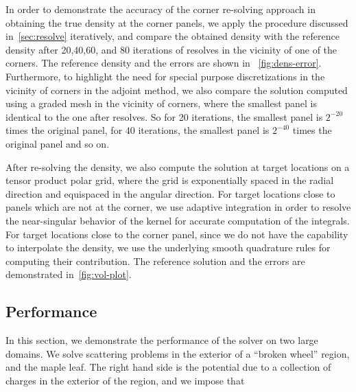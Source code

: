 In order to demonstrate the accuracy of the corner re-solving approach in obtaining the true density at the corner panels, we  apply the procedure
discussed in~\cref{sec:resolve} iteratively, and compare the obtained density with the reference density after 20,40,60, and
80 iterations of resolves in the vicinity of one of the corners. The reference density and the errors are shown in ~\cref{fig:dens-error}. Furthermore, to highlight the need for special purpose discretizations in the vicinity of corners in the adjoint method, we also compare the solution computed using a graded mesh in the vicinity of corners, where the smallest panel is identical
to the one after resolves. So for 20 iterations, the smallest panel is $2^{-20}$ times the original panel, for $40$ iterations,
the smallest panel is $2^{-40}$ times the original panel and so on.

After re-solving the density, we also compute the solution at target locations on a tensor product polar grid, where the grid
is exponentially spaced in the radial direction and equispaced in the angular direction. For target locations
close to panels which are not at the corner, we use adaptive integration in order to resolve the near-singular behavior of
the kernel for accurate computation of the integrals. For target locations close to the corner panel, since we do not have
the capability to interpolate the density, we use the underlying smooth quadrature rules for computing their contribution. 
The reference solution and the errors are demonstrated in~\cref{fig:vol-plot}.
\subsection{Performance}
In this section, we demonstrate the performance of the solver on two large domains. We solve scattering problems in the
exterior of a ``broken wheel'' region, and the maple leaf. The right hand side is the potential due to a collection of charges in the exterior of the region, and we impose that 